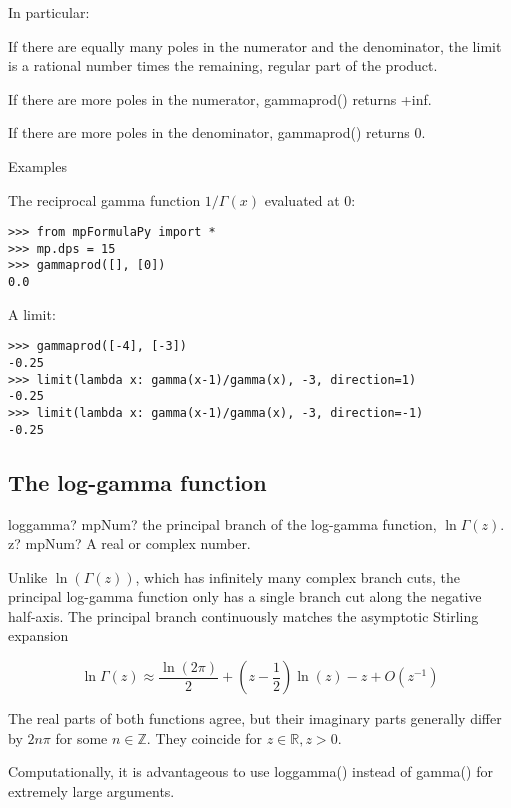 In particular:

If there are equally many poles in the numerator and the denominator, the limit is
a rational number times the remaining, regular part of the product.

If there are more poles in the numerator, gammaprod() returns +inf.

If there are more poles in the denominator, gammaprod() returns 0.

Examples

The reciprocal gamma function $1/\Gamma(x)$ evaluated at $0$:

\begin{lstlisting}
>>> from mpFormulaPy import *
>>> mp.dps = 15
>>> gammaprod([], [0])
0.0
\end{lstlisting}

A limit:

\begin{lstlisting}
>>> gammaprod([-4], [-3])
-0.25
>>> limit(lambda x: gamma(x-1)/gamma(x), -3, direction=1)
-0.25
>>> limit(lambda x: gamma(x-1)/gamma(x), -3, direction=-1)
-0.25
\end{lstlisting}


\subsection{The log-gamma function}

\begin{mpFunctionsExtract}
	\mpFunctionOne
	{loggamma? mpNum? the principal branch of the log-gamma function, $\ln\Gamma(z)$.}
	{z? mpNum? A real or complex number.}
\end{mpFunctionsExtract}

Unlike $\ln(\Gamma(z))$, which has infinitely many complex branch cuts, the principal log-gamma function only has a single branch cut along the negative half-axis. The principal branch continuously matches the asymptotic Stirling expansion

\begin{equation}
\ln \Gamma(z) \approx \frac{\ln(2\pi)}{2} + \left(z-\frac{1}{2} \right) \ln(z)-z+O(z^{-1}) 
\end{equation}

The real parts of both functions agree, but their imaginary parts generally differ by $2n\pi$ for some $n \in \mathbb{Z}$. They coincide for $z \in \mathbb{R}, z>0$.

Computationally, it is advantageous to use loggamma() instead of gamma() for extremely large arguments.

